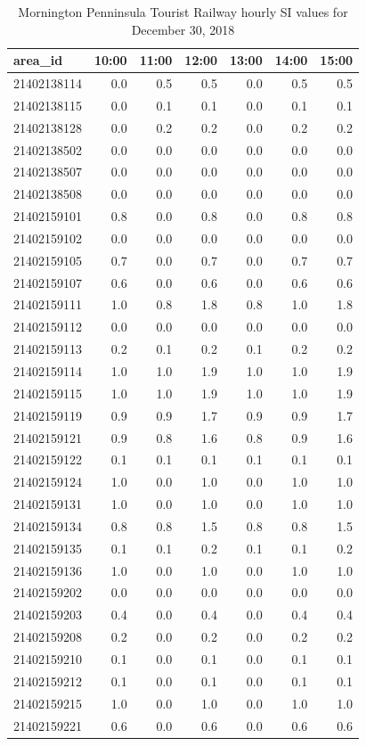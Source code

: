 \documentclass[preprint, 3p,
authoryear]{elsarticle} %
\begin{document}
\begin{table}
\caption{\label{tab:SI_mornington_20181230_output}Mornington Penninsula Tourist Railway hourly SI values for December 30, 2018}
\centering
\begin{tabular}[t]{l|r|r|r|r|r|r}
\hline
area\_id & 10:00 & 11:00 & 12:00 & 13:00 & 14:00 & 15:00\\
\hline
21402138114 & 0.0 & 0.5 & 0.5 & 0.0 & 0.5 & 0.5\\
\hline
21402138115 & 0.0 & 0.1 & 0.1 & 0.0 & 0.1 & 0.1\\
\hline
21402138128 & 0.0 & 0.2 & 0.2 & 0.0 & 0.2 & 0.2\\
\hline
21402138502 & 0.0 & 0.0 & 0.0 & 0.0 & 0.0 & 0.0\\
\hline
21402138507 & 0.0 & 0.0 & 0.0 & 0.0 & 0.0 & 0.0\\
\hline
21402138508 & 0.0 & 0.0 & 0.0 & 0.0 & 0.0 & 0.0\\
\hline
21402159101 & 0.8 & 0.0 & 0.8 & 0.0 & 0.8 & 0.8\\
\hline
21402159102 & 0.0 & 0.0 & 0.0 & 0.0 & 0.0 & 0.0\\
\hline
21402159105 & 0.7 & 0.0 & 0.7 & 0.0 & 0.7 & 0.7\\
\hline
21402159107 & 0.6 & 0.0 & 0.6 & 0.0 & 0.6 & 0.6\\
\hline
21402159111 & 1.0 & 0.8 & 1.8 & 0.8 & 1.0 & 1.8\\
\hline
21402159112 & 0.0 & 0.0 & 0.0 & 0.0 & 0.0 & 0.0\\
\hline
21402159113 & 0.2 & 0.1 & 0.2 & 0.1 & 0.2 & 0.2\\
\hline
21402159114 & 1.0 & 1.0 & 1.9 & 1.0 & 1.0 & 1.9\\
\hline
21402159115 & 1.0 & 1.0 & 1.9 & 1.0 & 1.0 & 1.9\\
\hline
21402159119 & 0.9 & 0.9 & 1.7 & 0.9 & 0.9 & 1.7\\
\hline
21402159121 & 0.9 & 0.8 & 1.6 & 0.8 & 0.9 & 1.6\\
\hline
21402159122 & 0.1 & 0.1 & 0.1 & 0.1 & 0.1 & 0.1\\
\hline
21402159124 & 1.0 & 0.0 & 1.0 & 0.0 & 1.0 & 1.0\\
\hline
21402159131 & 1.0 & 0.0 & 1.0 & 0.0 & 1.0 & 1.0\\
\hline
21402159134 & 0.8 & 0.8 & 1.5 & 0.8 & 0.8 & 1.5\\
\hline
21402159135 & 0.1 & 0.1 & 0.2 & 0.1 & 0.1 & 0.2\\
\hline
21402159136 & 1.0 & 0.0 & 1.0 & 0.0 & 1.0 & 1.0\\
\hline
21402159202 & 0.0 & 0.0 & 0.0 & 0.0 & 0.0 & 0.0\\
\hline
21402159203 & 0.4 & 0.0 & 0.4 & 0.0 & 0.4 & 0.4\\
\hline
21402159208 & 0.2 & 0.0 & 0.2 & 0.0 & 0.2 & 0.2\\
\hline
21402159210 & 0.1 & 0.0 & 0.1 & 0.0 & 0.1 & 0.1\\
\hline
21402159212 & 0.1 & 0.0 & 0.1 & 0.0 & 0.1 & 0.1\\
\hline
21402159215 & 1.0 & 0.0 & 1.0 & 0.0 & 1.0 & 1.0\\
\hline
21402159221 & 0.6 & 0.0 & 0.6 & 0.0 & 0.6 & 0.6\\
\hline
\end{tabular}
\end{table}
\end{document}
